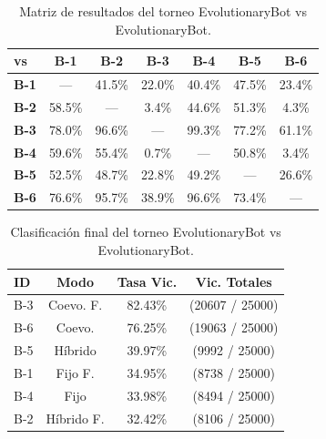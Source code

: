 \begin{table}[H]
	\centering
	\caption{Matriz de resultados del torneo EvolutionaryBot vs EvolutionaryBot.}
	\label{tab:coevo_benchmark_resultados}
	\begin{tabular}{@{}lcccccc@{}}
		\toprule
		\textbf{vs}  & \textbf{B-1} & \textbf{B-2} & \textbf{B-3} & \textbf{B-4} & \textbf{B-5} & \textbf{B-6} \\
		\midrule
		\textbf{B-1} & ---          & 41.5\%       & 22.0\%       & 40.4\%       & 47.5\%       & 23.4\%       \\
		\textbf{B-2} & 58.5\%       & ---          & 3.4\%        & 44.6\%       & 51.3\%       & 4.3\%        \\
		\textbf{B-3} & 78.0\%       & 96.6\%       & ---          & 99.3\%       & 77.2\%       & 61.1\%       \\
		\textbf{B-4} & 59.6\%       & 55.4\%       & 0.7\%        & ---          & 50.8\%       & 3.4\%        \\
		\textbf{B-5} & 52.5\%       & 48.7\%       & 22.8\%       & 49.2\%       & ---          & 26.6\%       \\
		\textbf{B-6} & 76.6\%       & 95.7\%       & 38.9\%       & 96.6\%       & 73.4\%       & ---          \\
		\bottomrule
	\end{tabular}
\end{table}

\begin{table}[H]
	\centering
	\caption{Clasificación final del torneo EvolutionaryBot vs EvolutionaryBot.}
	\label{tab:coevo_ranking_final}
	\begin{tabular}{@{}lccc@{}}
		\toprule
		\textbf{ID} & \textbf{Modo} & \textbf{Tasa Vic.} & \textbf{Vic. Totales} \\
		\midrule
		B-3         & Coevo. F.     & 82.43\%            & (20607 / 25000)       \\
		B-6         & Coevo.        & 76.25\%            & (19063 / 25000)       \\
		B-5         & Híbrido       & 39.97\%            & (9992 / 25000)        \\
		B-1         & Fijo F.       & 34.95\%            & (8738 / 25000)        \\
		B-4         & Fijo          & 33.98\%            & (8494 / 25000)        \\
		B-2         & Híbrido F.    & 32.42\%            & (8106 / 25000)        \\
		\bottomrule
	\end{tabular}
\end{table}

